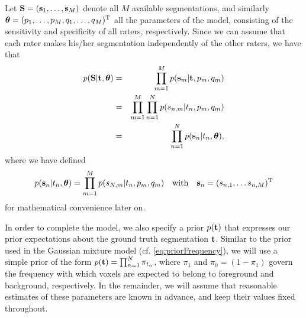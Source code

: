 \documentclass[10pt,twoside]{book}
\begin{document}
Let $\mathbf{S} = ( \mathbf{s}_1, \ldots, \mathbf{s}_M  )$ denote all $M$ available segmentations, and similarly
${\mbox{\boldmath {${\theta}$}}} = ( p_1, \ldots, p_M, q_1, \ldots, q_M )^\mathrm{T}$ all the parameters of the model, consisting of the sensitivity and specificity of all raters, respectively. 
Since we can assume that each rater makes his/her segmentation independently of the other raters, we have that
\begin{eqnarray}
  p( \mathbf{S} | \mathbf{t}, {\mbox{\boldmath {${\theta}$}}} ) & = & \prod_{m=1}^M p( \mathbf{s}_m | \mathbf{t}, p_m, q_m ) \nonumber \\
                                         & = & \prod_{m=1}^M \prod_{n=1}^N p( s_{n,m} | t_n, p_m, q_m ) \nonumber \\
                                         & = & \prod_{n=1}^N p( \mathbf{s}_n | t_n, {\mbox{\boldmath {${\theta}$}}} ),
\end{eqnarray}
where we have defined
\begin{equation}
  p( \mathbf{s}_n | t_n, {\mbox{\boldmath {${\theta}$}}} )
  =
  \prod_{m=1}^M p( s_{N,m} | t_n, p_m, q_m )
  \quad \mathrm{with} \quad
  \mathbf{s}_n = (s_{n,1}, \ldots s_{n,M})^\mathrm{T}
\end{equation}
for mathematical convenience later on.

In order to complete the model, we also specify a prior $p(\mathbf{t})$ that expresses our prior expectations about the ground truth segmentation $\mathbf{t}$. Similar to the prior used
in the Gaussian mixture model (cf. \eqref{eq:priorFrequency}), we will use a simple prior of the form
$p( \mathbf{t} ) = \prod_{n=1}^N \pi_{t_n}$,
where $\pi_1$ and  $\pi_0 = (1 - \pi_1)$ govern the frequency with which voxels are expected to belong to foreground and background, respectively. 
In the remainder, we will assume that reasonable estimates of these parameters are known in advance, and keep their values fixed throughout.
\end{document}

